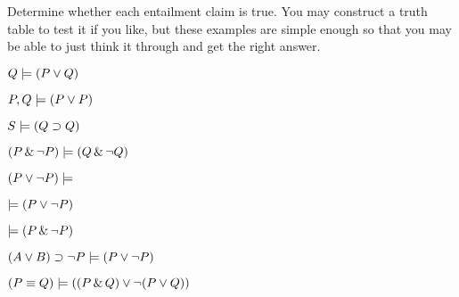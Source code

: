 \practiceproblems

\problempart
Determine whether each entailment claim is true. You may construct a truth table to test it if you like, but these examples are simple enough so that you may be able to just think it through and get the right answer.
\begin{earg}
\item $Q \models (P \vee Q)$
\item $P, Q \models (P \vee P)$
\item $S \models (Q \supset Q)$
\item $(P \,\&\, \neg P) \models (Q \,\&\, \neg Q)$
\item $(P \vee \neg P) \models$
\item $\models (P \vee \neg P)$
\item $\models (P \,\&\, \neg P)$
\item $(A \vee B) \supset \neg P \models (P \vee \neg P)$
\item $(P \equiv Q) \models ((P \,\&\, Q) \vee \neg (P \vee Q))$
\end{earg}

